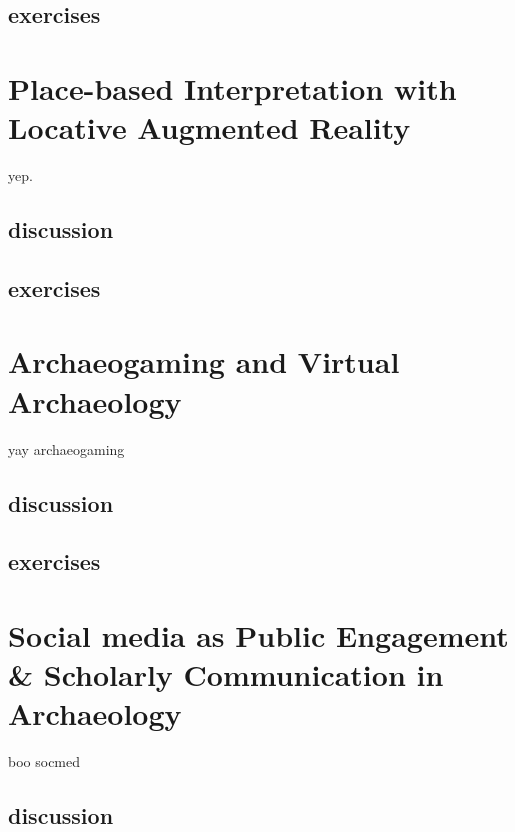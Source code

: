 \documentclass[english,]{book}
\begin{document}
\subsection{exercises}\label{exercises-12}

\section{Place-based Interpretation with Locative Augmented
Reality}\label{place-based-interpretation-with-locative-augmented-reality}

yep.

\subsection{discussion}\label{discussion-8}

\subsection{exercises}\label{exercises-13}

\section{Archaeogaming and Virtual
Archaeology}\label{archaeogaming-and-virtual-archaeology}

yay archaeogaming

\subsection{discussion}\label{discussion-9}

\subsection{exercises}\label{exercises-14}

\section{Social media as Public Engagement \& Scholarly Communication in
Archaeology}\label{social-media-as-public-engagement-scholarly-communication-in-archaeology}

boo socmed

\subsection{discussion}\label{discussion-10}
\end{document}
